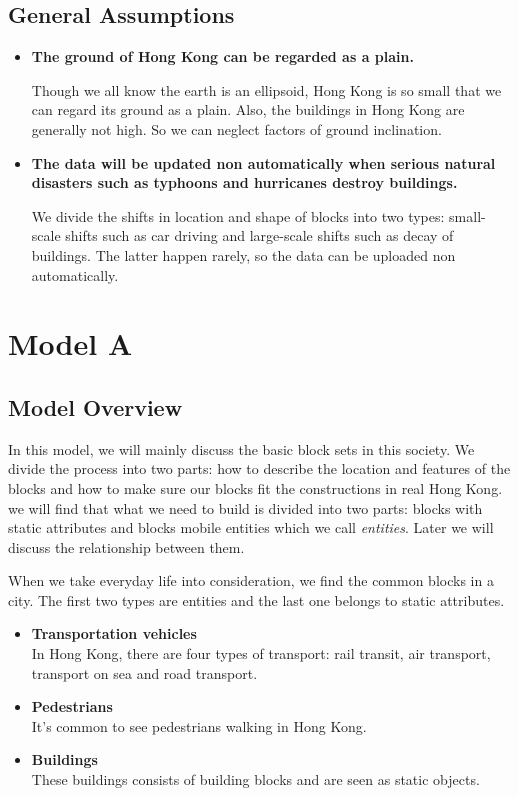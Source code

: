 \documentclass[12pt]{article}
\theoremstyle{definition}
\theoremstyle{remark}
\numberwithin{equation}{section}
\begin{document}
	\subsection{General Assumptions}
		\begin{itemize}
			\item \textbf{The ground of Hong Kong can be regarded as a plain.}
		
			Though we all know the earth is an ellipsoid, Hong Kong is so small that we can regard its ground as a plain. Also, the buildings in Hong Kong are generally not high. So we can neglect factors of ground inclination.
			\item \textbf{The data will be updated non automatically when serious natural disasters such as typhoons and hurricanes destroy buildings. }
			
			We divide the shifts in location and shape of blocks into two types: small-scale shifts such as car driving and large-scale shifts such as decay of buildings. The latter happen rarely, so the data can be uploaded non automatically.
		\end{itemize}
	
	\section{Model A}
	\subsection{Model Overview}
		In this model, we will mainly discuss the basic block sets in this society. We divide the process into two parts: how to describe the location and features of the blocks and how to make sure our blocks fit the constructions in real Hong Kong. we will find that what we need to build is divided into two parts: blocks with static attributes and blocks mobile entities which we call \textit{entities}. Later we will discuss the relationship between them.
		
		When we take everyday life into consideration, we find the common blocks in a city. The first two types are entities and the last one belongs to static attributes.
		\begin{itemize}
			\item \textbf{Transportation vehicles}\\ In Hong Kong, there are four types of transport: rail transit, air transport, transport on sea and road transport.
			\item \textbf{Pedestrians}\\It's common to see pedestrians walking in Hong Kong.
			\item \textbf{Buildings}\\ These buildings consists of building blocks and are seen as static objects.
		\end{itemize}
	
\end{document}
